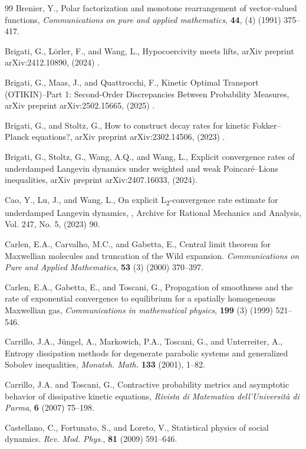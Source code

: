 \documentclass{article}
\begin{document}
\begin{thebibliography}{99}
Brenier, Y.,
Polar factorization and monotone rearrangement of vector-valued functions,
  \textit{Communications on pure and applied mathematics},
 \textbf{44}, (4)  (1991) 375--417.



Brigati, G., Lörler, F., and Wang, L., Hypocoercivity meets lifts, arXiv preprint arXiv:2412.10890, (2024) .

Brigati, G., Maas, J., and Quattrocchi, F., Kinetic Optimal Transport (OTIKIN)--Part 1: Second-Order Discrepancies Between Probability Measures, arXiv preprint arXiv:2502.15665, (2025) .

Brigati, G., and Stoltz, G., How to construct decay rates for kinetic Fokker--Planck equations?, arXiv preprint arXiv:2302.14506, (2023) .


Brigati, G., Stoltz, G., Wang, A.Q., and Wang, L., Explicit convergence rates of underdamped Langevin dynamics under weighted and weak Poincaré--Lions inequalities, arXiv preprint arXiv:2407.16033, (2024).

Cao, Y., Lu, J., and Wang, L., On explicit L\textsubscript{2}-convergence rate estimate for underdamped Langevin dynamics,  , Archive for Rational Mechanics and Analysis, Vol. 247, No. 5, (2023) 90.
 
 Carlen, E.A.,   Carvalho, M.C., and Gabetta, E., Central limit theorem for Maxwellian molecules and truncation of the Wild expansion. \emph{Communications on Pure and Applied Mathematics}, \textbf{53} (3) (2000) 370--397.
 
Carlen, E.A.,    Gabetta, E., and Toscani, G., Propagation of smoothness and the rate of exponential convergence to equilibrium for a spatially homogeneous Maxwellian gas,
\emph{Communications in mathematical physics}, \textbf{199} (3) (1999) 521--546.

Carrillo, J.A., J\"ungel, A., Markowich, P.A., Toscani, G., and Unterreiter, A., Entropy dissipation methods for degenerate parabolic systems and generalized Sobolev inequalities, \emph{Monatsh. Math.} \textbf{133} (2001), 1--82.

Carrillo, J.A. and Toscani, G., Contractive probability metrics and asymptotic behavior of dissipative kinetic equations, \textit{Rivista di Matematica dell'Universit\`a di Parma}, \textbf{6} (2007) 75--198.

Castellano, C., Fortunato, S., and Loreto, V.,
\newblock Statistical physics of social dynamics.
\newblock \emph{Rev. Mod. Phys.}, \textbf{81} (2009) 591--646.


\end{thebibliography}
\end{document}
